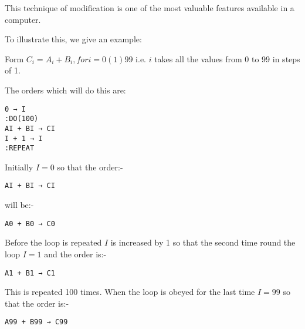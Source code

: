 \documentclass[10pt, a4paper, oneside]{article}
\begin{document}
\begin{multicols}{2}
This technique of modification is one of the
most valuable features available in a computer.

To illustrate this, we give an example:

Form $C_{i} = A_{i} + B_{i}, for i = 0 (1) 99$ i.e. $i$ takes all
the values from 0 to 99 in steps of 1.

The orders which will do this are:

\begin{addmargin}[1cm]{1em}%
\begin{lstlisting}
0 → I
:DO(100)
AI + BI → CI
I + 1 → I
:REPEAT
\end{lstlisting}
\end{addmargin}

Initially $I = 0$ so that the order:-

\begin{addmargin}[1cm]{1em}%
\begin{lstlisting}
AI + BI → CI
\end{lstlisting}
\end{addmargin}

will be:-

\begin{addmargin}[1cm]{1em}%
\begin{lstlisting}
A0 + B0 → C0
\end{lstlisting}
\end{addmargin}

Before the loop is repeated $I$ is increased
by 1 so that the second time round the loop $I = 1$ and
the order is:-

\begin{addmargin}[1cm]{1em}%
\begin{lstlisting}
A1 + B1 → C1
\end{lstlisting}
\end{addmargin}

This is repeated 100 times.  When the loop
is obeyed for the last time $I = 99$ so that the order is:-

\begin{addmargin}[1cm]{1em}%
\begin{lstlisting}
A99 + B99 → C99
\end{lstlisting}
\end{addmargin}

\begingroup
\centering
{}
\end{multicols}
\end{document}
